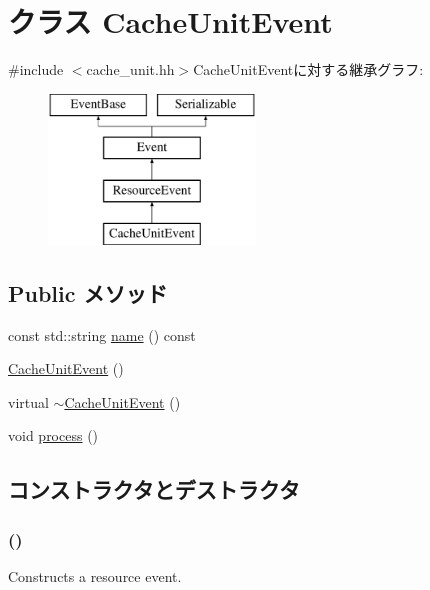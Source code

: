 \hypertarget{classCacheUnitEvent}{
\section{クラス CacheUnitEvent}
\label{classCacheUnitEvent}
}


{\ttfamily \#include $<$cache\_\-unit.hh$>$}CacheUnitEventに対する継承グラフ:\begin{figure}[H]
\begin{center}
\leavevmode
\includegraphics[height=4cm]{classCacheUnitEvent}
\end{center}
\end{figure}
\subsection*{Public メソッド}
\begin{DoxyCompactItemize}
\item 
const std::string \hyperlink{classCacheUnitEvent_a6490f765a824ced1cc94979609fe7e07}{name} () const 
\item 
\hyperlink{classCacheUnitEvent_a1977d71d1b4ff7c0598ede1c4da67818}{CacheUnitEvent} ()
\item 
virtual \hyperlink{classCacheUnitEvent_aa916e060e7102c3be76298f0cc4506e6}{$\sim$CacheUnitEvent} ()
\item 
void \hyperlink{classCacheUnitEvent_a2e9c5136d19b1a95fc427e0852deab5c}{process} ()
\end{DoxyCompactItemize}


\subsection{コンストラクタとデストラクタ}
\hypertarget{classCacheUnitEvent_a1977d71d1b4ff7c0598ede1c4da67818}{
\subsubsection[{CacheUnitEvent}]{ ()}}
\label{classCacheUnitEvent_a1977d71d1b4ff7c0598ede1c4da67818}
Constructs a resource event. 


